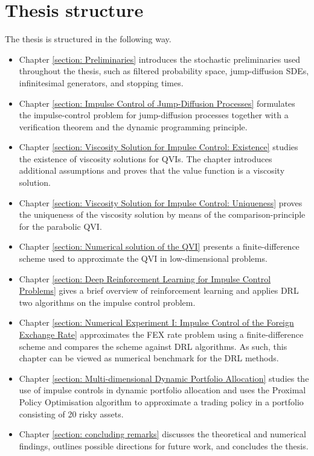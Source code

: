 \section*{Thesis structure}
The thesis is structured in the following way.
\begin{itemize}
    \item Chapter \ref{section: Preliminaries} introduces the stochastic preliminaries used throughout the thesis, such as filtered probability space, jump-diffusion SDEs, infinitesimal generators, and stopping times.
    \item Chapter \ref{section: Impulse Control of Jump-Diffusion Processes} formulates the impulse-control problem for jump-diffusion processes together with a verification theorem and the dynamic programming principle. 
    \item Chapter \ref{section: Viscosity Solution for Impulse Control: Existence} studies the existence of viscosity solutions for QVIs. The chapter introduces additional assumptions and proves that the value function is a viscosity solution. 
    \item Chapter \ref{section: Viscosity Solution for Impulse Control: Uniqueness} proves the uniqueness of the viscosity solution by means of the comparison-principle for the parabolic QVI. 
    \item Chapter \ref{section: Numerical solution of the QVI} presents a finite-difference scheme used to approximate the QVI in low-dimensional problems. 
    \item Chapter \ref{section: Deep Reinforcement Learning for Impulse Control Problems} gives a brief overview of reinforcement learning and applies DRL two algorithms on the impulse control problem.
    \item Chapter \ref{section: Numerical Experiment I: Impulse Control of the Foreign Exchange Rate} approximates the FEX rate problem using a finite-difference scheme and compares the scheme against DRL algorithms. As such, this chapter can be viewed as numerical benchmark for the DRL methods. 
    \item Chapter \ref{section: Multi-dimensional Dynamic Portfolio Allocation} studies the use of impulse controls in dynamic portfolio allocation and uses the Proximal Policy Optimisation algorithm to approximate a trading policy in a portfolio consisting of 20 risky assets. 
    \item Chapter \ref{section: concluding remarks} discusses the theoretical and numerical findings, outlines possible directions for future work, and concludes the thesis. 
\end{itemize}

